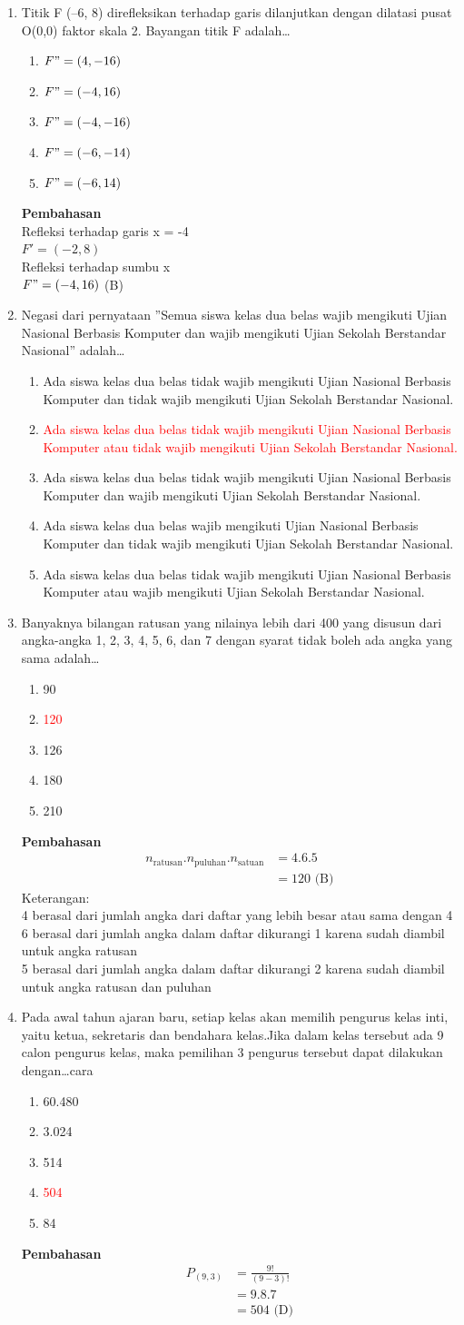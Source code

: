 \documentclass{report}
\newcommand{\options}[5]{
\begin{enumerate}[label=\alph*.]
	\item #1
	\item #2
	\item #3
	\item #4
	\item #5
\end{enumerate}
}
\newcommand{\pemb}{ \textbf{Pembahasan} \\}
\begin{document}
\begin{enumerate}
\item Titik F (–6, 8) direfleksikan terhadap garis dilanjutkan dengan dilatasi pusat O(0,0) faktor skala 2. Bayangan titik F adalah\ldots
\options
{$F"=(4,-16)$}
{\textcolor{red}{$F"=(-4,16)$}}
{$F"=(-4,-16)$}
{$F"=(-6,-14)$}
{$F"=(-6,14)$}
\pemb
Refleksi terhadap garis x = -4 \\
$F'=(-2,8)$ \\
Refleksi terhadap sumbu x \\
$F"=(-4,16)$ (B) \\

\item Negasi dari pernyataan ”Semua siswa kelas dua belas wajib mengikuti Ujian Nasional Berbasis Komputer dan wajib mengikuti Ujian Sekolah Berstandar Nasional” adalah\ldots
\options
{Ada siswa kelas dua belas tidak wajib mengikuti Ujian Nasional Berbasis Komputer dan tidak wajib mengikuti Ujian Sekolah Berstandar Nasional.}
{\textcolor{red}{Ada siswa kelas dua belas tidak wajib mengikuti Ujian Nasional Berbasis Komputer atau tidak wajib mengikuti Ujian Sekolah Berstandar Nasional.}}
{Ada siswa kelas dua belas tidak wajib mengikuti Ujian Nasional Berbasis Komputer dan wajib mengikuti Ujian Sekolah Berstandar Nasional.}
{Ada siswa kelas dua belas wajib mengikuti Ujian Nasional Berbasis Komputer dan tidak wajib mengikuti Ujian Sekolah Berstandar Nasional.}
{Ada siswa kelas dua belas tidak wajib mengikuti Ujian Nasional Berbasis Komputer
atau wajib mengikuti Ujian Sekolah Berstandar Nasional.}

\item Banyaknya bilangan ratusan yang nilainya lebih dari 400 yang disusun dari angka-angka 1, 2, 3, 4, 5, 6, dan 7 dengan syarat tidak boleh ada angka yang sama adalah\ldots
\options
{90}
{\textcolor{red}{120}}
{126}
{180}
{210}
\pemb
\begin{align*}
	n_{\text{ratusan}}.n_{\text{puluhan}}.n_{\text{satuan}} 
	&= 4.6.5 \\
	&= 120 \text{ (B)}
\end{align*}
Keterangan: \\
4 berasal dari jumlah angka dari daftar yang lebih besar atau sama dengan 4 \\
6 berasal dari jumlah angka dalam daftar dikurangi 1 karena sudah diambil untuk angka ratusan \\
5 berasal dari jumlah angka dalam daftar dikurangi 2 karena sudah diambil untuk angka ratusan dan puluhan \\

\item Pada awal tahun ajaran baru, setiap kelas akan memilih pengurus kelas inti, yaitu ketua, sekretaris dan bendahara kelas.Jika dalam kelas tersebut ada 9 calon pengurus kelas, maka pemilihan 3 pengurus tersebut dapat dilakukan dengan\ldots cara
\options
{60.480}
{3.024}
{514}
{\textcolor{red}{504}}
{84}
\pemb
\begin{align*}
	P_{(9,3)} 
	&= \frac{9!}{(9-3)!} \\
	&= 9.8.7 \\
	&= 504 \text{ (D)}
\end{align*}


\end{enumerate}
\end{document}
